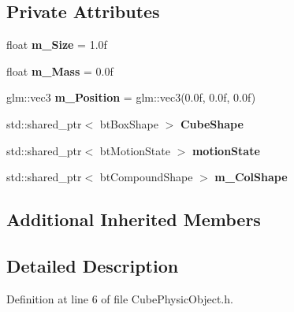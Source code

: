 \subsection*{Private Attributes}
\begin{DoxyCompactItemize}
\item 
float {\bfseries m\+\_\+\+Size} = 1.\+0f\hypertarget{class_physics_1_1_cube_physic_object_a49edd861021c769d5d1d747043feb56a}{}\label{class_physics_1_1_cube_physic_object_a49edd861021c769d5d1d747043feb56a}

\item 
float {\bfseries m\+\_\+\+Mass} = 0.\+0f\hypertarget{class_physics_1_1_cube_physic_object_a6828f9bf568f840d07b853421c3876e1}{}\label{class_physics_1_1_cube_physic_object_a6828f9bf568f840d07b853421c3876e1}

\item 
glm\+::vec3 {\bfseries m\+\_\+\+Position} = glm\+::vec3(0.\+0f, 0.\+0f, 0.\+0f)\hypertarget{class_physics_1_1_cube_physic_object_a80de2908178c79d690b047676f96afe1}{}\label{class_physics_1_1_cube_physic_object_a80de2908178c79d690b047676f96afe1}

\item 
std\+::shared\+\_\+ptr$<$ bt\+Box\+Shape $>$ {\bfseries Cube\+Shape}\hypertarget{class_physics_1_1_cube_physic_object_ae0d63fbd5bc97dbd3c8c7e90be96e5e9}{}\label{class_physics_1_1_cube_physic_object_ae0d63fbd5bc97dbd3c8c7e90be96e5e9}

\item 
std\+::shared\+\_\+ptr$<$ bt\+Motion\+State $>$ {\bfseries motion\+State}\hypertarget{class_physics_1_1_cube_physic_object_a6441b26c2be6eff8cb5102e428ebf4ce}{}\label{class_physics_1_1_cube_physic_object_a6441b26c2be6eff8cb5102e428ebf4ce}

\item 
std\+::shared\+\_\+ptr$<$ bt\+Compound\+Shape $>$ {\bfseries m\+\_\+\+Col\+Shape}\hypertarget{class_physics_1_1_cube_physic_object_a3b70e8d67173fe57b2527ba6e22fc6e0}{}\label{class_physics_1_1_cube_physic_object_a3b70e8d67173fe57b2527ba6e22fc6e0}

\end{DoxyCompactItemize}
\subsection*{Additional Inherited Members}


\subsection{Detailed Description}


Definition at line 6 of file Cube\+Physic\+Object.\+h.

